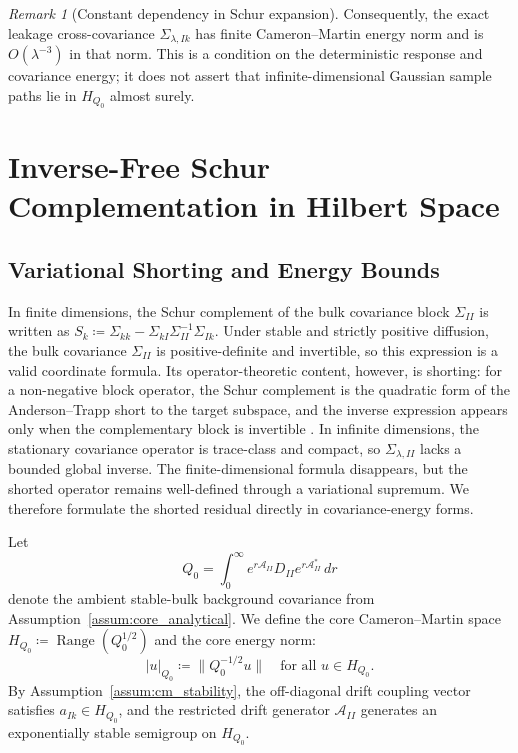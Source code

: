 \documentclass[preprint,12pt]{elsarticle}
\theoremstyle{plain}
\theoremstyle{definition}
\theoremstyle{remark}
\newtheorem{remark}[theorem]{Remark}
\begin{document}
    \begin{remark}[Constant dependency in Schur expansion]
        Consequently, the exact leakage cross-covariance
        $\Sigma_{\lambda,Ik}$ has finite Cameron--Martin energy norm and is
        $O(\lambda^{-3})$ in that norm.  This is a condition on the deterministic
        response and covariance energy; it does not assert that infinite-dimensional
        Gaussian sample paths lie in $H_{Q_0}$ almost surely.
    \end{remark}

    \section{Inverse-Free Schur Complementation in Hilbert Space}
    \label{sec:infdim}

    \subsection{Variational Shorting and Energy Bounds}
    \label{sec:infdim:variational}

    In finite dimensions, the Schur complement of the bulk covariance block
    $\Sigma_{II}$ is written as
    $S_k \coloneqq \Sigma_{kk} - \Sigma_{kI}\Sigma_{II}^{-1}\Sigma_{Ik}$.
    Under stable and strictly positive diffusion, the bulk covariance
    $\Sigma_{II}$ is positive-definite and invertible, so this expression is a
    valid coordinate formula.  Its operator-theoretic content, however, is
    shorting: for a non-negative block operator, the Schur complement is the
    quadratic form of the Anderson--Trapp short to the target subspace, and the
    inverse expression appears only when the complementary block is invertible
    \cite{krein1947selfadjoint,anderson1975shorted}.  In infinite dimensions,
    the stationary covariance operator is trace-class and compact, so
    $\Sigma_{\lambda,II}$ lacks a bounded global inverse.  The finite-dimensional
    formula disappears, but the shorted operator remains well-defined through a
    variational supremum.  We therefore formulate the shorted residual directly
    in covariance-energy forms.

    Let
    \[
    Q_0
    =
    \int_0^\infty e^{r\mathcal A_{II}}D_{II}e^{r\mathcal A_{II}^*}\,dr
    \]
    denote the ambient stable-bulk background covariance from Assumption~\ref{assum:core_analytical}. We define the core Cameron--Martin space $H_{Q_0} \coloneqq \operatorname{Range}(Q_0^{1/2})$ and the core energy norm:
    \begin{equation}
        |u|_{Q_0} \coloneqq \|Q_0^{-1/2} u\| \quad \text{for all } u \in H_{Q_0}.
    \end{equation}
    By Assumption~\ref{assum:cm_stability}, the off-diagonal drift coupling vector satisfies $a_{Ik} \in H_{Q_0}$, and the restricted drift generator $\mathcal{A}_{II}$ generates an exponentially stable semigroup on $H_{Q_0}$.
\end{document}
